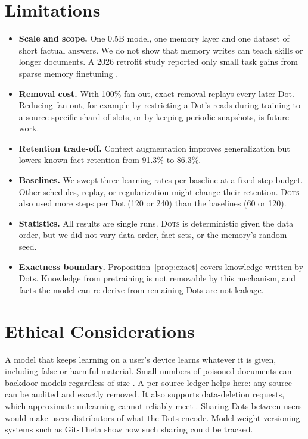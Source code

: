 \documentclass[11pt]{article}
\newcommand{\sys}{\textsc{Dots}}
\begin{document}
\section*{Limitations}
\label{sec:limits}

\begin{itemize}
  \item \textbf{Scale and scope.} One 0.5B model, one memory layer and one dataset of short factual answers. We do not show that memory writes can teach skills or longer documents. A 2026 retrofit study reported only small task gains from sparse memory finetuning \citep{gupta2026smf}.
  \item \textbf{Removal cost.} With 100\% fan-out, exact removal replays every later Dot. Reducing fan-out, for example by restricting a Dot's reads during training to a source-specific shard of slots, or by keeping periodic snapshots, is future work.
  \item \textbf{Retention trade-off.} Context augmentation improves generalization but lowers known-fact retention from 91.3\% to 86.3\%.
  \item \textbf{Baselines.} We swept three learning rates per baseline at a fixed step budget. Other schedules, replay, or regularization might change their retention. \sys{} also used more steps per Dot (120 or 240) than the baselines (60 or 120).
  \item \textbf{Statistics.} All results are single runs. \sys{} is deterministic given the data order, but we did not vary data order, fact sets, or the memory's random seed.
  \item \textbf{Exactness boundary.} Proposition~\ref{prop:exact} covers knowledge written by Dots. Knowledge from pretraining is not removable by this mechanism, and facts the model can re-derive from remaining Dots are not leakage.
\end{itemize}

\section*{Ethical Considerations}

A model that keeps learning on a user's device learns whatever it is given, including false or harmful material. Small numbers of poisoned documents can backdoor models regardless of size \citep{souly2025poisoning}. A per-source ledger helps here: any source can be audited and exactly removed. It also supports data-deletion requests, which approximate unlearning cannot reliably meet \citep{zhang2025quant}. Sharing Dots between users would make users distributors of what the Dots encode. Model-weight versioning systems such as Git-Theta \citep{kandpal2023gittheta} show how such sharing could be tracked.
\end{document}
